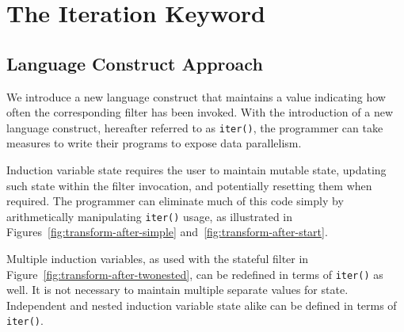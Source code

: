%  
%
%
%
%
%
%    
%
%

\section{The Iteration Keyword}
\label{sec:iteration}
\subsection{Language Construct Approach}
We introduce a new language construct that maintains a value 
indicating how often the corresponding filter has been invoked.  
With the introduction of a new language construct, hereafter referred to as {\tt iter()}, the programmer can take measures to write their programs to expose data parallelism.  

Induction variable state requires the user to maintain mutable state, updating such state within the filter invocation, and potentially resetting them when required. The programmer can eliminate much of this code simply by arithmetically manipulating {\tt iter()} usage, as illustrated in Figures~\ref{fig:transform-after-simple} and~\ref{fig:transform-after-start}.

Multiple induction variables, as used with the stateful filter in Figure~\ref{fig:transform-after-twonested}, can be redefined in terms of {\tt iter()} as well.  It is not necessary to maintain multiple separate values for state.  Independent and nested induction variable state alike can be defined in terms of {\tt iter()}.


